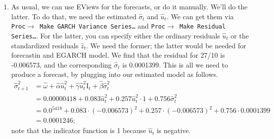 \documentclass[11pt, a4paper]{article}
\begin{document}
\begin{enumerate}
\begin{enumerate}
\begin{center}
\end{center}
\item As usual, we can use EViews for the forecasts, or do it manually. We'll do the latter. To do that, we need the estimated $\widehat{\sigma}_t$ and $\hat{u}_t$. We can get them via \texttt{Proc$\rightarrow$ Make GARCH Variance Series\ldots} and \texttt{Proc$\rightarrow$ Make Residual Series\ldots}. For the latter, you can specify either the ordinary residuals $\hat{u}_t$ or the standardized residuals $\hat{z}_t$. We need the former; the latter would be needed for forecastin and EGARCH model.
    We find that the residual for 27/10 is -0.006573, and the corresponding $\widehat{\sigma}_t$ is 0.0001399. This is all we need to produce a forecast, by plugging into our estimated model as follows.
\begin{align*}
\widehat{\sigma} _{t+1}^{2}&=\hat\omega +\hat\alpha \hat u_{t}^{2}+\hat\gamma \hat u_{t}^{2}\text{I}_{t}+\hat\beta \hat\sigma _{t}^{2}\\
&=0.00000418 +0.083 \hat u_{t}^{2}+0.257 \hat u_{t}^{2}\cdot 1+0.756 \hat\sigma _{t}^{2}\\
&=0.0^5418 +0.083 \cdot(-0.006573)^2+0.257\cdot (-0.006573)^2+0.756 \cdot0.0001399\\&=0.0001246;
\end{align*}
note that the indicator function is 1 because $\hat{u}_t$ is negative.


\end{enumerate}
\end{enumerate}
\end{document}
